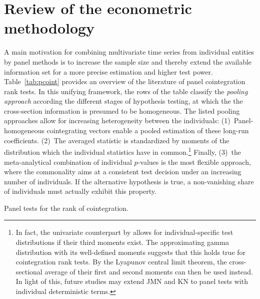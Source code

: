  
\section{Review of the econometric methodology} \label{sec:Review}
A main motivation for combining multivariate time series from individual entities by panel methods is to increase the sample size and thereby extend the available information set for a more precise estimation and higher test power.
Table~\ref{tab:pcoint} provides an overview of the literature of panel cointegration rank tests. In this unifying framework, the rows of the table classify the \textit{pooling approach} according the different stages of hypothesis testing, at which the the cross-section information is presumed to be homogeneous. The listed pooling approaches allow for increasing heterogeneity between the individuals: (1)~Panel-homogeneous cointegrating vectors enable a pooled estimation of these long-run coefficients. (2)~The averaged statistic is standardized by moments of the distribution which the individual statistics have in common.\footnote{In fact, the univariate counterpart by \citet[p.~59, Remark~3.1]{ImPesaranShin2003} allows for individual-specific test distributions if their third moments exist. The approximating gamma distribution with its well-defined moments suggests that this holds true for cointegration rank tests. By the Lyapunov central limit theorem, the cross-sectional average of their first and second moments can then be used instead. In light of this, future studies may extend JMN \citeyearpar{JohansenEtAl2000} and KN \citeyearpar{KuritaNielsen2019} to panel tests with individual deterministic terms.} Finally, (3)~the meta-analytical combination of individual $p$-values is the most flexible approach, where the commonality aims at a consistent test decision under an increasing number of individuals. If the alternative hypothesis is true, a non-vanishing share of individuals must actually exhibit this property.

\begin{table}[ht]	%
	\centering
	\caption{Panel tests for the rank of cointegration.}
	\resizebox{\textwidth}{!}{ 
		}
	\label{tab:pcoint}		
\end{table}

